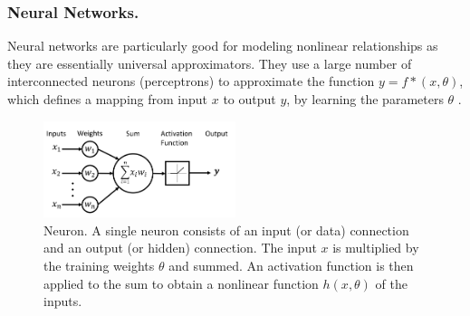 

\subsubsection{Neural Networks.}
Neural networks are particularly good for modeling nonlinear relationships as they are essentially universal approximators.
They use a large number of interconnected neurons (perceptrons) to approximate the function $y = f*(x, \theta)$, which defines a mapping from input $x$ to output $y$, by learning the parameters $\theta$ \cite{eriksson2021deep}.

\begin{figure}[!ht]
    \centering
    \includegraphics[width=0.5\textwidth]{images/neuron.png}
    \caption{Neuron. A single neuron consists of an input (or data) connection and an output (or hidden) connection. The input $x$ is multiplied by the training weights $\theta$ and summed. An activation function is then applied to the sum to obtain a nonlinear function $h(x,\theta)$ of the inputs.}
    \label{fig:neuron}
\end{figure}


